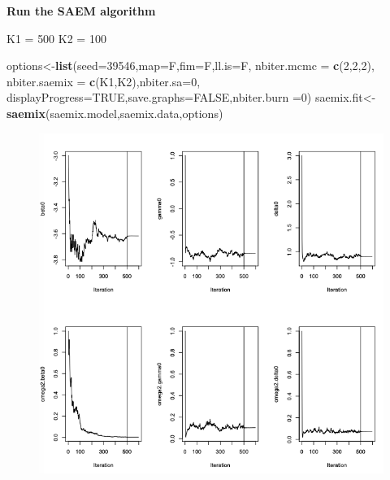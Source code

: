 \documentclass[]{book}
\newenvironment{Shaded}{\begin{snugshade}}{\end{snugshade}}
\newcommand{\KeywordTok}[1]{\textcolor[rgb]{0.13,0.29,0.53}{\textbf{{#1}}}}
\newcommand{\DataTypeTok}[1]{\textcolor[rgb]{0.13,0.29,0.53}{{#1}}}
\newcommand{\DecValTok}[1]{\textcolor[rgb]{0.00,0.00,0.81}{{#1}}}
\newcommand{\StringTok}[1]{\textcolor[rgb]{0.31,0.60,0.02}{{#1}}}
\newcommand{\OtherTok}[1]{\textcolor[rgb]{0.56,0.35,0.01}{{#1}}}
\newcommand{\NormalTok}[1]{{#1}}
\begin{document}
\textbf{Run the SAEM algorithm}

\begin{Shaded}
\begin{Highlighting}[]
\NormalTok{K1 =}\StringTok{ }\DecValTok{500}
\NormalTok{K2 =}\StringTok{ }\DecValTok{100}

\NormalTok{options<-}\KeywordTok{list}\NormalTok{(}\DataTypeTok{seed=}\DecValTok{39546}\NormalTok{,}\DataTypeTok{map=}\NormalTok{F,}\DataTypeTok{fim=}\NormalTok{F,}\DataTypeTok{ll.is=}\NormalTok{F,}
  \DataTypeTok{nbiter.mcmc =} \KeywordTok{c}\NormalTok{(}\DecValTok{2}\NormalTok{,}\DecValTok{2}\NormalTok{,}\DecValTok{2}\NormalTok{), }\DataTypeTok{nbiter.saemix =} \KeywordTok{c}\NormalTok{(K1,K2),}\DataTypeTok{nbiter.sa=}\DecValTok{0}\NormalTok{,}
  \DataTypeTok{displayProgress=}\OtherTok{TRUE}\NormalTok{,}\DataTypeTok{save.graphs=}\OtherTok{FALSE}\NormalTok{,}\DataTypeTok{nbiter.burn =}\DecValTok{0}\NormalTok{)}
\NormalTok{saemix.fit<-}\KeywordTok{saemix}\NormalTok{(saemix.model,saemix.data,options)}
\end{Highlighting}
\end{Shaded}

\begin{figure}

{\centering \includegraphics[width=1\linewidth]{figures/param_cat} 

}

\end{figure}
\end{document}
